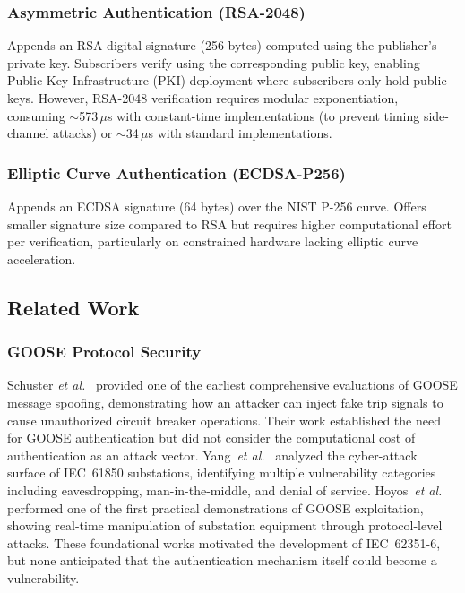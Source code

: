 \documentclass{ieeeaccess}
\begin{document}
\subsubsection{Asymmetric Authentication (RSA-2048)}
Appends an RSA digital signature (256 bytes) computed using the publisher's private key. Subscribers verify using the corresponding public key, enabling Public Key Infrastructure (PKI) deployment where subscribers only hold public keys. However, RSA-2048 verification requires modular exponentiation, consuming $\sim$573\,$\mu$s with constant-time implementations (to prevent timing side-channel attacks) or $\sim$34\,$\mu$s with standard implementations.

\subsubsection{Elliptic Curve Authentication (ECDSA-P256)}
Appends an ECDSA signature (64 bytes) over the NIST P-256 curve. Offers smaller signature size compared to RSA but requires higher computational effort per verification, particularly on constrained hardware lacking elliptic curve acceleration.

\subsection{Related Work}

\subsubsection{GOOSE Protocol Security}
Schuster \textit{et al.}~\cite{schuster2017goose} provided one of the earliest comprehensive evaluations of GOOSE message spoofing, demonstrating how an attacker can inject fake trip signals to cause unauthorized circuit breaker operations. Their work established the need for GOOSE authentication but did not consider the computational cost of authentication as an attack vector. Yang~\textit{et al.}~\cite{yang2013cyber} analyzed the cyber-attack surface of IEC~61850 substations, identifying multiple vulnerability categories including eavesdropping, man-in-the-middle, and denial of service. Hoyos~\textit{et al.}~\cite{hoyos2012real} performed one of the first practical demonstrations of GOOSE exploitation, showing real-time manipulation of substation equipment through protocol-level attacks. These foundational works motivated the development of IEC~62351-6, but none anticipated that the authentication mechanism itself could become a vulnerability.
\end{document}
